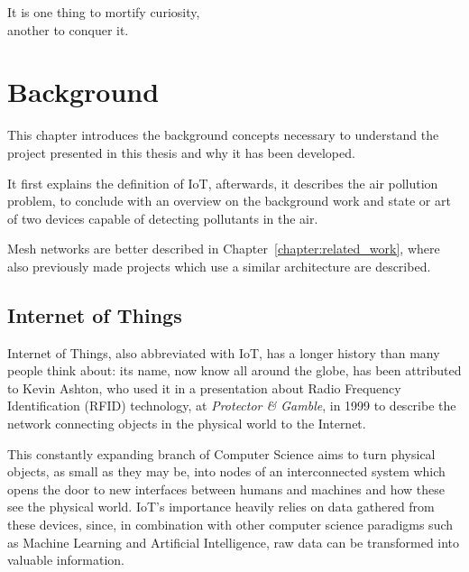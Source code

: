 
\begin{savequote}[70mm]
	It is one thing to mortify curiosity,\\another to conquer it.
\end{savequote}

\chapter{Background}\label{chapter:background}

	This chapter introduces the background concepts necessary to understand the project presented in this thesis and why it has been developed.
	
	It first explains the definition of IoT, afterwards, it describes the air pollution problem, to conclude with an overview on the background work and state or art of two devices capable of detecting pollutants in the air.

	Mesh networks are better described in Chapter~\ref{chapter:related_work}, where also previously made projects which use a similar architecture are described.

	\section{Internet of Things}
	
		
		Internet of Things, also abbreviated with IoT, has a longer history than many people think about: its name, now know all around the globe, has been attributed to Kevin Ashton, who used it in a presentation about Radio Frequency Identification (RFID) technology, at \textit{Protector \& Gamble}, in 1999 \cite{iot_definition} to describe the network connecting objects in the physical world to the Internet.
		
		This constantly expanding branch of Computer Science aims to turn physical objects, as small as they may be, into nodes of an interconnected system which opens the door to new interfaces between humans and machines and how these see the physical world.
		IoT's importance heavily relies on data gathered from these devices, since, in combination with other computer science paradigms such as Machine Learning and Artificial Intelligence, raw data can be transformed into valuable information.
	

